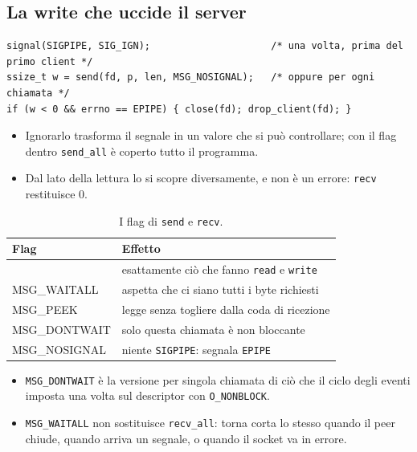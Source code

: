 \subsection{La write che uccide il server}


\begin{lstlisting}[language={[POSIX]C}, style=wnumbers, title={Due modi di sopravvivere}]
signal(SIGPIPE, SIG_IGN);                     /* una volta, prima del primo client */
ssize_t w = send(fd, p, len, MSG_NOSIGNAL);   /* oppure per ogni chiamata */
if (w < 0 && errno == EPIPE) { close(fd); drop_client(fd); }
\end{lstlisting}

\begin{itemize}
    \item Ignorarlo trasforma il segnale in un valore che si può controllare; con il flag dentro \texttt{send\_all} è
          coperto tutto il programma.
    \item Dal lato della lettura lo si scopre diversamente, e non è un errore: \texttt{recv} restituisce 0.
\end{itemize}

\begin{table}[H]
\centering
\begin{tabular}{>{\ttfamily}l l}
\toprule
\normalfont\textbf{Flag} & \textbf{Effetto} \\
\midrule
0            & esattamente ciò che fanno \texttt{read} e \texttt{write} \\
MSG\_WAITALL  & aspetta che ci siano tutti i byte richiesti \\
MSG\_PEEK     & legge senza togliere dalla coda di ricezione \\
MSG\_DONTWAIT & solo questa chiamata è non bloccante \\
MSG\_NOSIGNAL & niente \texttt{SIGPIPE}: segnala \texttt{EPIPE} \\
\bottomrule
\end{tabular}
\caption{I flag di \texttt{send} e \texttt{recv}.}
\end{table}

\begin{itemize}
    \item \texttt{MSG\_DONTWAIT} è la versione per singola chiamata di ciò che il ciclo degli eventi imposta una volta sul
          descriptor con \texttt{O\_NONBLOCK}.
    \item \texttt{MSG\_WAITALL} non sostituisce \texttt{recv\_all}: torna corta lo stesso quando il peer chiude, quando
          arriva un segnale, o quando il socket va in errore.
\end{itemize}

